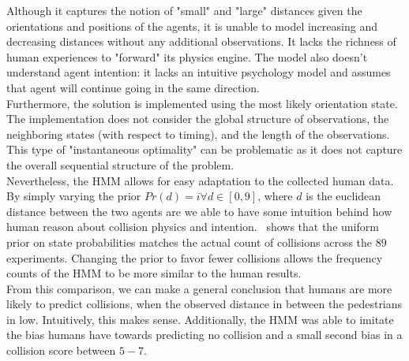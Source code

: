 Although it captures the notion of "small" and "large" distances given the orientations and positions of the agents, it is unable to model increasing and decreasing distances without any additional observations. It lacks the richness of human experiences to "forward" its physics engine. The model also doesn't understand agent intention: it lacks an intuitive psychology model and assumes that agent will continue going in the same direction. \\
Furthermore, the solution is implemented using the most likely orientation state. The implementation does not consider the global structure of observations, the neighboring states (with respect to timing), and the length of the observations. This type of "instantaneous optimality" can be problematic as it does not capture the overall sequential structure of the problem. \\
Nevertheless, the HMM allows for easy adaptation to the collected human data. By simply varying the prior $Pr(d) = i \forall d \in [0,9]$, where $d$ is the euclidean distance between the two agents are we able to have some intuition behind how human reason about collision physics and intention.~ shows that the uniform prior on state probabilities matches the actual count of collisions across the $89$ experiments. Changing the prior to favor fewer collisions allows the frequency counts of the HMM to be more similar to the human results. \\
From this comparison, we can make a general conclusion that humans are more likely to predict collisions, when the observed distance in between the pedestrians in low. Intuitively, this makes sense. Additionally, the HMM was able to imitate the bias humans have towards predicting no collision and a small second bias in a collision score between $5-7$.

